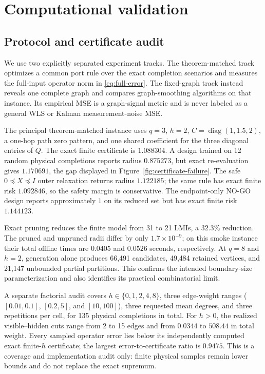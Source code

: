 \documentclass[journal,10pt]{IEEEtran}
\theoremstyle{definition}
\theoremstyle{remark}
\newcommand{\diag}{\operatorname{diag}}
\begin{document}
\section{Computational validation}

\subsection{Protocol and certificate audit}

We use two explicitly separated experiment tracks.  The theorem-matched track
optimizes a common port rule over the exact completion scenarios and measures
the full-input operator norm in \eqref{eq:full-error}.  The fixed-graph track
instead reveals one complete graph and compares graph-smoothing algorithms on
that instance.  Its empirical MSE is a graph-signal metric and is never labeled
as a general WLS or Kalman measurement-noise MSE.

The principal theorem-matched instance uses $q=3$, $h=2$,
$C=\diag(1,1.5,2)$, a one-hop path zero pattern, and one shared coefficient for
the three diagonal entries of $Q$.  The exact finite certificate is
$1.088304$.  A design trained on 12 random physical completions reports radius
$0.875273$, but exact re-evaluation gives $1.170691$, the gap displayed in
Figure~\ref{fig:certificate-failure}.  The safe
$0\preceq X\preceq I$ outer relaxation returns radius $1.122185$; the same
rule has exact finite risk $1.092846$, so the safety margin is conservative.
The endpoint-only NO-GO design reports approximately $1$ on its reduced set
but has exact finite risk $1.144123$.

Exact pruning reduces the finite model from 31 to 21 LMIs, a $32.3\%$
reduction.  The pruned and unpruned radii differ by only
$1.7\times10^{-9}$; on this smoke instance their total offline times are
$0.0405$ and $0.0526$ seconds, respectively.  At $q=8$ and $h=2$, generation
alone produces 66,491 candidates, 49,484 retained vertices, and 21,147
unbounded partial partitions.  This confirms the intended boundary-size
parameterization and also identifies its practical combinatorial limit.

A separate factorial audit covers $h\in\{0,1,2,4,8\}$, three edge-weight
ranges ($[0.01,0.1]$, $[0.2,5]$, and $[10,100]$), three requested mean
degrees, and three repetitions per cell, for 135 physical completions in
total.  For $h>0$, the realized visible--hidden cuts range from 2 to 15 edges
and from $0.0344$ to $508.44$ in total weight.  Every sampled operator error
lies below its independently computed exact finite-$h$ certificate; the
largest error-to-certificate ratio is $0.9475$.  This is a coverage and
implementation audit only: finite physical samples remain lower bounds and do
not replace the exact supremum.
\end{document}
